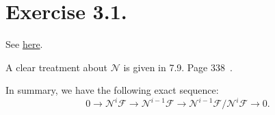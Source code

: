 \section{Exercise 3.1.}

See \href{https://math.stackexchange.com/questions/3183772/hartshorne-exercise-iii-3-2-x-is-affine-iff-every-component-is-affine}{here}.

A clear treatment about $\mathscr N$ is given in 7.9. Page 338~\cite{mumford2015algebraic}.

In summary, we have the following exact sequence:
\[0\to \mathscr N^i\mathscr F\to \mathscr N^{i-1}\mathscr F\to \mathscr N^{i-1}\mathscr F/\mathscr N^{i}\mathscr F\to 0.\]
